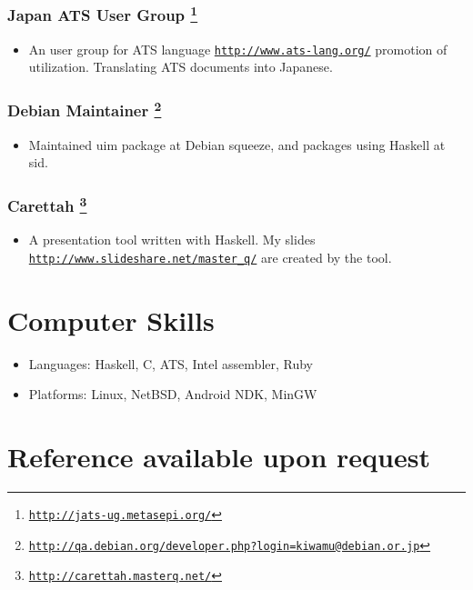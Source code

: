 \documentclass[letterpaper]{article}
\begin{document}
\subsubsection*{Japan ATS User Group \footnote{\href{http://jats-ug.metasepi.org/}{\tt http://jats-ug.metasepi.org/}}}
\begin{itemize}
\item An user group for ATS language \href{http://www.ats-lang.org/}{\tt http://www.ats-lang.org/} promotion of utilization. Translating ATS documents into Japanese.
\end{itemize}

\subsubsection*{Debian Maintainer \footnote{\href{http://qa.debian.org/developer.php?login=kiwamu@debian.or.jp}{\tt http://qa.debian.org/developer.php?login=kiwamu@debian.or.jp}}}
\begin{itemize}
\item Maintained uim package at Debian squeeze, and packages using Haskell at sid.
\end{itemize}

\subsubsection*{Carettah \footnote{\href{http://carettah.masterq.net/}{\tt http://carettah.masterq.net/}}}
\begin{itemize}
\item A presentation tool written with Haskell. My slides \href{http://www.slideshare.net/master\_q/}{\tt http://www.slideshare.net/master\_q/} are created by the tool.
\end{itemize}

\section*{Computer Skills}

\begin{itemize}
  \item Languages: Haskell, C, ATS, Intel assembler, Ruby
  \item Platforms: Linux, NetBSD, Android NDK, MinGW
\end{itemize}

\section*{Reference available upon request}
\end{document}
